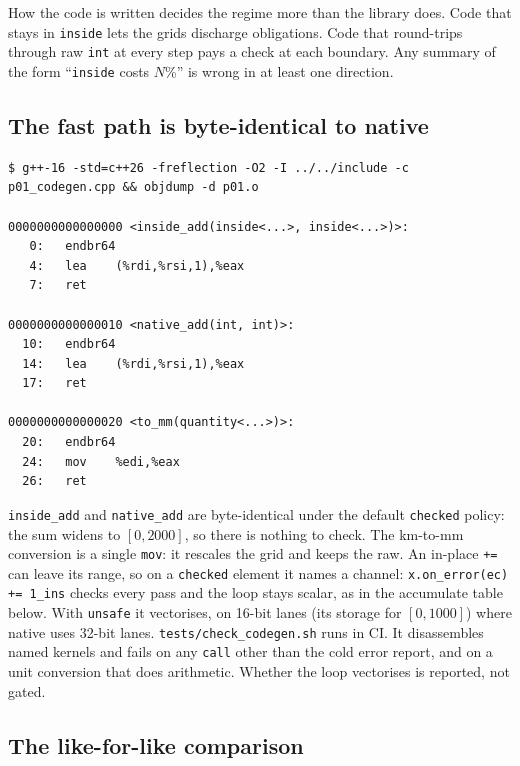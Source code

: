 \documentclass[11pt,a4paper]{article}
\newcommand{\code}[1]{\texttt{\small #1}}
\newcommand{\file}[1]{\texttt{\small #1}}
\begin{document}
\noindent
How the code is written decides the regime more than the library does. Code
that stays in \code{inside} lets the grids discharge obligations. Code that
round-trips through raw \code{int} at every step pays a check at each
boundary. Any summary of the form ``\code{inside} costs $N$\%'' is wrong in at
least one direction.

\subsection{The fast path is byte-identical to native}\label{sec:codegen}


\begin{lstlisting}[style=term]
$ g++-16 -std=c++26 -freflection -O2 -I ../../include -c p01_codegen.cpp && objdump -d p01.o

0000000000000000 <inside_add(inside<...>, inside<...>)>:
   0:   endbr64
   4:   lea    (%rdi,%rsi,1),%eax
   7:   ret

0000000000000010 <native_add(int, int)>:
  10:   endbr64
  14:   lea    (%rdi,%rsi,1),%eax
  17:   ret

0000000000000020 <to_mm(quantity<...>)>:
  20:   endbr64
  24:   mov    %edi,%eax
  26:   ret
\end{lstlisting}

\noindent
\code{inside\_add} and \code{native\_add} are byte-identical under the
default \code{checked} policy: the sum widens to $[0, 2000]$, so there is
nothing to check. The km-to-mm conversion is a single \code{mov}: it rescales
the grid and keeps the raw. An in-place \code{+=} can leave its range, so on
a \code{checked} element it names a channel: \code{x.on\_error(ec) += 1\_ins}
checks every pass and the loop stays scalar, as in the accumulate table below. With \code{unsafe} it vectorises, on 16-bit lanes
(its storage for $[0,1000]$) where native uses 32-bit lanes.
\file{tests/check\_codegen.sh} runs in CI. It disassembles named
kernels and fails on any \code{call} other than the cold error report, and on
a unit conversion that does arithmetic. Whether the loop vectorises is
reported, not gated.

\subsection{The like-for-like comparison}\label{sec:fair}
\end{document}

